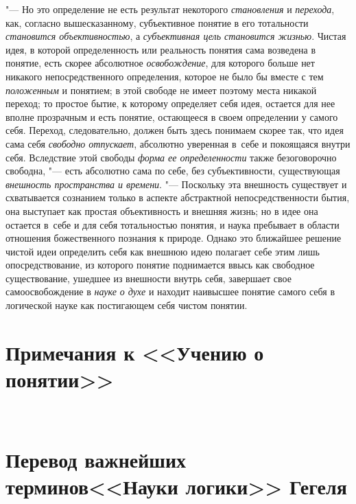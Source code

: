 "--- Но это определение не есть результат некоторого
{\em становления} и {\em перехода}, как,
согласно вышесказанному, субъективное понятие в его тотальности
{\em становится объективностью}, а {\em субъективная цель
становится жизнью}. Чистая идея, в которой определенность
или реальность понятия сама возведена в понятие, есть скорее абсолютное
{\em освобождение}, для
которого больше нет никакого непосредственного определения, которое не было
бы вместе с тем {\em положенным}
и понятием; в этой свободе не имеет поэтому места никакой
переход; то простое бытие, к которому определяет себя идея, остается для
нее вполне прозрачным и есть понятие, остающееся в своем определении у
самого себя. Переход, следовательно, должен быть здесь понимаем скорее так,
что идея сама себя {\em свободно
отпускает}, абсолютно уверенная в~себе и покоящаяся внутри
себя. Вследствие этой свободы {\em форма
ее определенности} также безоговорочно свободна, "---
есть абсолютно сама по себе, без субъективности, существующая
{\em внешность пространства и времени}.
"--- Поскольку эта внешность существует и схватывается
сознанием только в аспекте абстрактной непосредственности
бытия, она выступает как простая объективность и внешняя жизнь; но в идее
она остается в~себе и для себя тотальностью понятия, и наука пребывает в
области отношения божественного познания к природе. Однако это ближайшее
решение чистой идеи определить себя как внешнюю идею полагает себе этим
лишь опосредствование, из которого понятие поднимается ввысь как свободное
существование, ушедшее из внешности внутрь себя, завершает свое
самоосвобождение в {\em науке о духе}
и находит наивысшее понятие самого себя в логической науке
как постигающем себя чистом понятии.

\clearpage
\chapter[Примечания к <<Учению о понятии>>]{Примечания к <<Учению о понятии>>}
\bigskip
\bigskip
\printpagenotes
\bigskip
\bigskip


\clearpage\
\chapter[Перевод важнейших терминов <<Науки логики>> Гегеля]
{Перевод важнейших терминов\newline<<Науки логики>> Гегеля}

\bigskip

